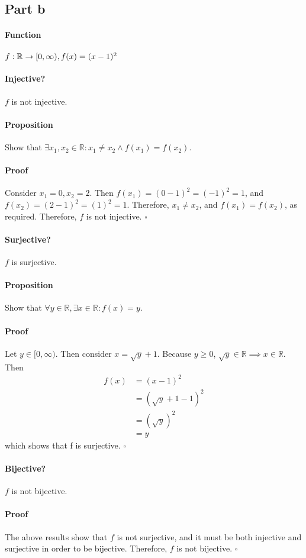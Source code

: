 \documentclass{article}
\begin{document}
\subsection{Part b}
{
\paragraph{Function}$f:\mathbb{R}\xrightarrow{}{[0,\infty)}, f(x)=(x-1)^2$
{
\paragraph{Injective?}
$f$ is not injective.
\vspace{-10pt}
\paragraph{Proposition}
Show that $\exists x_1, x_2 \in \mathbb{R} : x_1 \neq x_2 \land f(x_1) = f(x_2)$.
\vspace{-10pt}
\paragraph{Proof}
Consider $x_1=0, x_2=2$. Then $f(x_1)=(0-1)^2=(-1)^2 = 1$, and $f(x_2)=(2-1)^2=(1)^2=1$. Therefore, $x_1 \neq x_2$, and $f(x_1) = f(x_2)$, as required. Therefore, $f$ is not injective. $\square$
}
{
\paragraph{Surjective?}
$f$ is surjective.
\vspace{-10pt}
\paragraph{Proposition}
Show that $\forall y \in \mathbb{R}, \exists x \in \mathbb{R} : f(x) = y$.
\vspace{-10pt}
\paragraph{Proof}
Let $y \in [0, \infty)$. Then consider $x=\sqrt{y}+1$. Because $y \geq 0$, $\sqrt{y} \in \mathbb{R} \implies x \in \mathbb{R}$. Then 
\begin{align*}
    f(x) &= (x-1)^2\\
    &= (\sqrt{y}+1-1)^2\\
    &= (\sqrt{y})^2\\
    &= y
\end{align*}
\noindent which shows that f is surjective. $\square$
}
{
\paragraph{Bijective?}
$f$ is not bijective.
\vspace{-10pt}
\paragraph{Proof}
The above results show that $f$ is not surjective, and it must be both injective and surjective in order to be bijective. Therefore, $f$ is not bijective. $\square$
}
}
\end{document}
